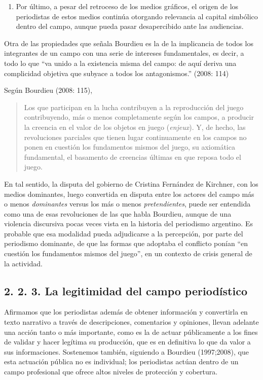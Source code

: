 \begin{enumerate}
\def\labelenumi{\alph{enumi})}
\setcounter{enumi}{4}
\item
  Por último, a pesar del retroceso de los medios gráficos, el origen de los periodistas de estos medios continúa otorgando relevancia al capital simbólico dentro del campo, aunque pueda pasar desapercibido ante las audiencias.
\end{enumerate}

Otra de las propiedades que señala Bourdieu es la de la implicancia de todos los integrantes de un campo con una serie de intereses fundamentales, es decir, a todo lo que ``va unido a la existencia misma del campo: de aquí deriva una complicidad objetiva que subyace a todos los antagonismos.'' (2008: 114)

Según Bourdieu (2008: 115),

\begin{quote}
Los que participan en la lucha contribuyen a la reproducción del juego contribuyendo, más o menos completamente según los campos, a producir la creencia en el valor de los objetos en juego (\emph{enjeux}). Y, de hecho, las revoluciones parciales que tienen lugar continuamente en los campos no ponen en cuestión los fundamentos mismos del juego, su axiomática fundamental, el basamento de creencias últimas en que reposa todo el juego.
\end{quote}

En tal sentido, la disputa del gobierno de Cristina Fernández de Kirchner, con los medios dominantes, luego convertida en disputa entre los actores del campo más o menos \emph{dominantes} versus los más o menos \emph{pretendientes}, puede ser entendida como una de esas revoluciones de las que habla Bourdieu, aunque de una violencia discursiva pocas veces vista en la historia del periodismo argentino. Es probable que esa modalidad pueda adjudicarse a la percepción, por parte del periodismo dominante, de que las formas que adoptaba el conflicto ponían ``en cuestión los fundamentos mismos del juego'', en un contexto de crisis general de la actividad.


\subsection{2. 2. 3. La legitimidad del campo periodístico}

Afirmamos que los periodistas además de obtener información y convertirla en texto narrativo a través de descripciones, comentarios y opiniones, llevan adelante una acción tanto o más importante, como es la de actuar públicamente a los fines de validar y hacer legítima su producción, que es en definitiva lo que da valor a sus informaciones. Sostenemos también, siguiendo a Bourdieu (1997;2008), que esta actuación pública no es individual; los periodistas actúan dentro de un campo profesional que ofrece altos niveles de protección y cobertura.


